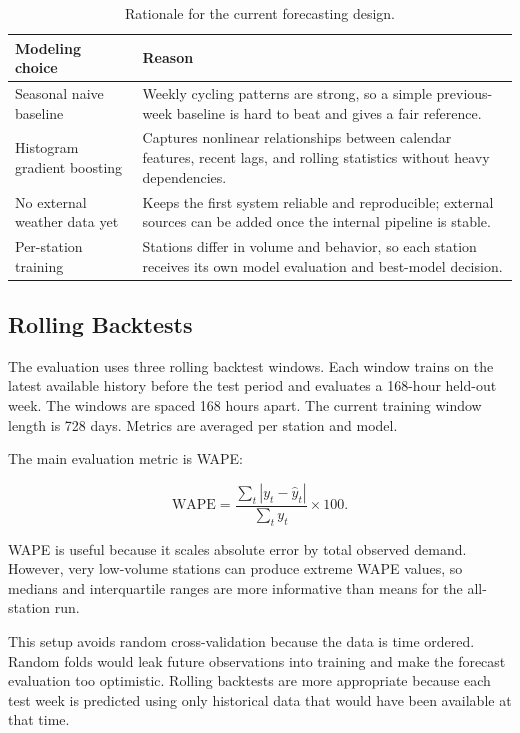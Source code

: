 \documentclass[11pt]{article}
\begin{document}
\begin{table}[htbp]
\centering
\caption{Rationale for the current forecasting design.}
\small
\begin{tabularx}{0.96\textwidth}{lX}
\toprule
\textbf{Modeling choice} & \textbf{Reason} \\
\midrule
Seasonal naive baseline & Weekly cycling patterns are strong, so a simple previous-week baseline is hard to beat and gives a fair reference. \\
Histogram gradient boosting & Captures nonlinear relationships between calendar features, recent lags, and rolling statistics without heavy dependencies. \\
No external weather data yet & Keeps the first system reliable and reproducible; external sources can be added once the internal pipeline is stable. \\
Per-station training & Stations differ in volume and behavior, so each station receives its own model evaluation and best-model decision. \\
\bottomrule
\end{tabularx}
\end{table}

\subsection{Rolling Backtests}

The evaluation uses three rolling backtest windows. Each window trains on the latest available history before the test period and evaluates a 168-hour held-out week. The windows are spaced 168 hours apart. The current training window length is 728 days. Metrics are averaged per station and model.

The main evaluation metric is WAPE:

\[
\text{WAPE} =
\frac{\sum_t |y_t - \hat{y}_t|}{\sum_t y_t} \times 100.
\]

WAPE is useful because it scales absolute error by total observed demand. However, very low-volume stations can produce extreme WAPE values, so medians and interquartile ranges are more informative than means for the all-station run.

This setup avoids random cross-validation because the data is time ordered. Random folds would leak future observations into training and make the forecast evaluation too optimistic. Rolling backtests are more appropriate because each test week is predicted using only historical data that would have been available at that time.
\end{document}
